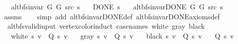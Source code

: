 \begin{isabellebody}
\ \ \ {\isachardoublequoteopen}alt{\isacharunderscore}{\kern0pt}bfs{\isacharunderscore}{\kern0pt}invar{\isacharprime}{\kern0pt}\ G{}\ G{}\ src\ s{\isachardoublequoteclose}\isanewline
\ \ \ {\isachardoublequoteopen}DONE\ s{\isachardoublequoteclose}\isanewline
\ \ \ {\isachardoublequoteopen}alt{\isacharunderscore}{\kern0pt}bfs{\isacharunderscore}{\kern0pt}invar{\isacharunderscore}{\kern0pt}DONE{\isacharprime}{\kern0pt}\ G{}\ G{}\ src\ s{\isachardoublequoteclose}\isanewline
%
\isadelimproof
\ \ %
\endisadelimproof
%
\isatagproof
{}\isamarkupfalse%
\ assms\isanewline
\ \ \isamarkupfalse%
\ {\isacharparenleft}{\kern0pt}simp\ add{\isacharcolon}{\kern0pt}\ alt{\isacharunderscore}{\kern0pt}bfs{\isacharunderscore}{\kern0pt}invar{\isacharunderscore}{\kern0pt}DONE{\isacharunderscore}{\kern0pt}def\ alt{\isacharunderscore}{\kern0pt}bfs{\isacharunderscore}{\kern0pt}invar{\isacharunderscore}{\kern0pt}DONE{\isacharunderscore}{\kern0pt}axioms{\isacharunderscore}{\kern0pt}def{\isacharparenright}{\kern0pt}%
\endisatagproof
{\isafoldproof}%
%
\isadelimproof
%
\endisadelimproof
%
\isadelimdocument
%
\endisadelimdocument
%
\isatagdocument
%
\isamarkuptrue%
%
\endisatagdocument
{\isafolddocument}%
%
\isadelimdocument
%
\endisadelimdocument
{}\isamarkupfalse%
\ {\isacharparenleft}{\kern0pt}\ alt{\isacharunderscore}{\kern0pt}bfs{\isacharunderscore}{\kern0pt}valid{\isacharunderscore}{\kern0pt}input{\isacharparenright}{\kern0pt}\ vertex{\isacharunderscore}{\kern0pt}color{\isacharunderscore}{\kern0pt}induct\ {\isacharbrackleft}{\kern0pt}case{\isacharunderscore}{\kern0pt}names\ white\ gray\ black{\isacharbrackright}{\kern0pt}{\isacharcolon}{\kern0pt}\isanewline
\ \ \ {\isachardoublequoteopen}white\ s\ v\ {\isasymLongrightarrow}\ Q{\isacharprime}{\kern0pt}\ s\ v{\isachardoublequoteclose}\isanewline
\ \ \ {\isachardoublequoteopen}gray\ s\ v\ {\isasymLongrightarrow}\ Q{\isacharprime}{\kern0pt}\ s\ v{\isachardoublequoteclose}\isanewline
\ \ \ {\isachardoublequoteopen}black\ s\ v\ {\isasymLongrightarrow}\ Q{\isacharprime}{\kern0pt}\ s\ v{\isachardoublequoteclose}\isanewline
\ \ \ {\isachardoublequoteopen}Q{\isacharprime}{\kern0pt}\ s\ v{\isachardoublequoteclose}\isanewline
%
\isadelimproof
\ \ %
\endisadelimproof

\end{isabellebody}
